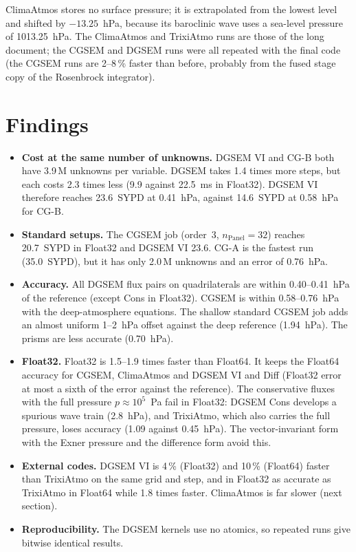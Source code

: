 \documentclass[11pt,a4paper]{article}
\begin{document}
\noindent ClimaAtmos stores no surface pressure; it is extrapolated from
the lowest level and shifted by $-13.25$~hPa, because its baroclinic wave
uses a sea-level pressure of 1013.25~hPa. The ClimaAtmos and TrixiAtmo
runs are those of the long document; the CGSEM and DGSEM runs were all
repeated with the final code (the CGSEM runs are 2--8\,\% faster than
before, probably from the fused stage copy of the Rosenbrock integrator).

\section{Findings}

\begin{itemize}
\item \textbf{Cost at the same number of unknowns.} DGSEM VI and CG-B both
  have 3.9\,M unknowns per variable. DGSEM takes 1.4 times more steps, but
  each costs 2.3 times less (9.9 against 22.5~ms in Float32). DGSEM VI
  therefore reaches 23.6~SYPD at 0.41~hPa, against 14.6~SYPD at
  0.58~hPa for CG-B.
\item \textbf{Standard setups.} The CGSEM job (order~3,
  $n_\text{Panel}=32$) reaches 20.7~SYPD in Float32 and DGSEM VI 23.6.
  CG-A is the fastest run (35.0~SYPD), but it has only 2.0\,M unknowns and
  an error of 0.76~hPa.
\item \textbf{Accuracy.} All DGSEM flux pairs on quadrilaterals are within
  0.40--0.41~hPa of the reference (except Cons in Float32). CGSEM is
  within 0.58--0.76~hPa with the deep-atmosphere equations. The shallow
  standard CGSEM job adds an almost uniform 1--2~hPa offset against the
  deep reference (1.94~hPa). The prisms are less accurate (0.70~hPa).
\item \textbf{Float32.} Float32 is 1.5--1.9 times faster than Float64. It
  keeps the Float64 accuracy for CGSEM, ClimaAtmos and DGSEM VI and Diff
  (Float32 error at most a sixth of the error against the reference). The
  conservative fluxes with the full pressure $p\approx10^5$~Pa fail in
  Float32: DGSEM Cons develops a spurious wave train (2.8~hPa), and
  TrixiAtmo, which also carries the full pressure, loses accuracy
  (1.09 against 0.45~hPa). The vector-invariant form with the Exner
  pressure and the difference form avoid this.
\item \textbf{External codes.} DGSEM VI is 4\,\% (Float32) and 10\,\%
  (Float64) faster than TrixiAtmo on the same grid and step, and in
  Float32 as accurate as TrixiAtmo in Float64 while 1.8 times faster.
  ClimaAtmos is far slower (next section).
\item \textbf{Reproducibility.} The DGSEM kernels use no atomics, so
  repeated runs give bitwise identical results.
\end{itemize}
\end{document}
